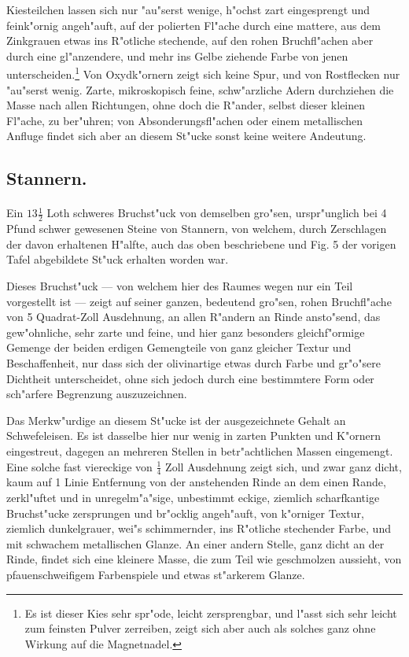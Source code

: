 \documentclass[a4paper, 11pt, oneside, german]{article}
\begin{document}
Kiesteilchen lassen sich nur "au"serst wenige, h"ochst zart eingesprengt und feink"ornig angeh"auft, auf der polierten Fl"ache durch eine mattere, aus dem Zinkgrauen etwas ins R"otliche stechende, auf den rohen Bruchfl"achen aber durch eine gl"anzendere, und mehr ins Gelbe ziehende Farbe von jenen unterscheiden.\footnote{Es ist dieser Kies sehr spr"ode, leicht zersprengbar, und l"asst sich sehr leicht zum feinsten Pulver zerreiben, zeigt sich aber auch als solches ganz ohne Wirkung auf die Magnetnadel.} Von Oxydk"ornern zeigt sich keine Spur, und von Rostflecken nur "au"serst wenig. Zarte, mikroskopisch feine, schw"arzliche Adern durchziehen die Masse nach allen Richtungen, ohne doch die R"ander, selbst dieser kleinen Fl"ache, zu ber"uhren; von Absonderungsfl"achen oder einem metallischen Anfluge findet sich aber an diesem St"ucke sonst keine weitere Andeutung.

\subsection{Stannern.}
\paragraph{}
Ein $13\frac{1}{2}$ Loth schweres Bruchst"uck von demselben gro"sen, urspr"unglich bei 4 Pfund schwer gewesenen Steine von Stannern, von welchem, durch Zerschlagen der davon erhaltenen H"alfte, auch das oben beschriebene und Fig. 5 der vorigen Tafel abgebildete St"uck erhalten worden war.

Dieses Bruchst"uck --- von welchem hier des Raumes wegen nur ein Teil vorgestellt ist --- zeigt auf seiner ganzen, bedeutend gro"sen, rohen Bruchfl"ache von 5 Quadrat-Zoll Ausdehnung, an allen R"andern an Rinde ansto"send, das gew"ohnliche, sehr zarte und feine, und hier ganz besonders gleichf"ormige Gemenge der beiden erdigen Gemengteile von ganz gleicher Textur und Beschaffenheit, nur dass sich der olivinartige etwas durch Farbe und gr"o"sere Dichtheit unterscheidet, ohne sich jedoch durch eine bestimmtere Form oder sch"arfere Begrenzung auszuzeichnen.

Das Merkw"urdige an diesem St"ucke ist der ausgezeichnete Gehalt an Schwefeleisen. Es ist dasselbe hier nur wenig in zarten Punkten und K"ornern eingestreut, dagegen an mehreren Stellen in betr"achtlichen Massen eingemengt. Eine solche fast viereckige von $\frac{1}{4}$ Zoll Ausdehnung zeigt sich, und zwar ganz dicht, kaum auf 1 Linie Entfernung von der anstehenden Rinde an dem einen Rande, zerkl"uftet und in unregelm"a"sige, unbestimmt eckige, ziemlich scharfkantige Bruchst"ucke zersprungen und br"ocklig angeh"auft, von k"orniger Textur, ziemlich dunkelgrauer, wei"s schimmernder, ins R"otliche stechender Farbe, und mit schwachem metallischen Glanze. An einer andern Stelle, ganz dicht an der Rinde, findet sich eine kleinere Masse, die zum Teil wie geschmolzen aussieht, von pfauenschweifigem Farbenspiele und etwas st"arkerem Glanze.
\clearpage
\end{document}
